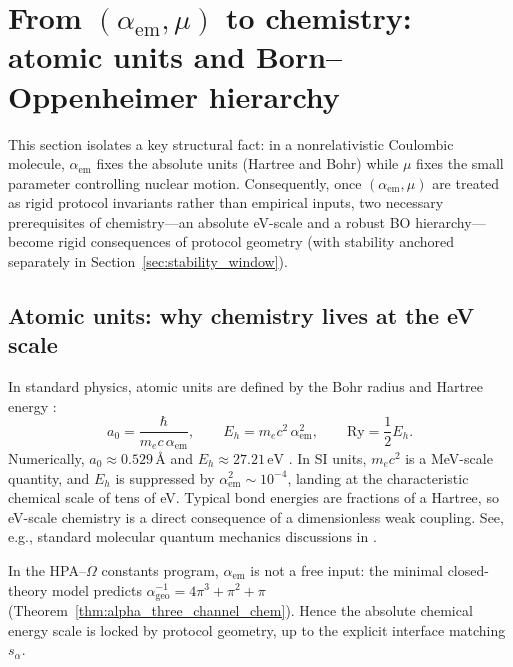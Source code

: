 \section{From $(\alpha_{\mathrm{em}},\mu)$ to chemistry: atomic units and Born--Oppenheimer hierarchy}
\label{sec:chemistry_scaling}

This section isolates a key structural fact: in a nonrelativistic Coulombic molecule, $\alpha_{\mathrm{em}}$ fixes the absolute units (Hartree and Bohr) while $\mu$ fixes the small parameter controlling nuclear motion. Consequently, once $(\alpha_{\mathrm{em}},\mu)$ are treated as rigid protocol invariants rather than empirical inputs, two necessary prerequisites of chemistry---an absolute eV-scale and a robust BO hierarchy---become rigid consequences of protocol geometry (with stability anchored separately in Section~\ref{sec:stability_window}).

\subsection{Atomic units: why chemistry lives at the eV scale}
In standard physics, atomic units are defined by the Bohr radius and Hartree energy \cite{CODATA2022RMP}:
\begin{equation}
a_0=\frac{\hbar}{m_e c\,\alpha_{\mathrm{em}}},
\qquad
E_h=m_e c^2\,\alpha_{\mathrm{em}}^2,
\qquad
\mathrm{Ry}=\frac12 E_h.
\end{equation}
Numerically, $a_0\approx 0.529\,\text{\AA}$ and $E_h\approx 27.21\,\mathrm{eV}$ \cite{CODATA2022RMP}.
In SI units, $m_e c^2$ is a MeV-scale quantity, and $E_h$ is suppressed by $\alpha_{\mathrm{em}}^2\sim 10^{-4}$, landing at the characteristic chemical scale of tens of eV. Typical bond energies are fractions of a Hartree, so eV-scale chemistry is a direct consequence of a dimensionless weak coupling.
See, e.g., standard molecular quantum mechanics discussions in \cite{AtkinsFriedman2011}.

In the HPA--$\Omega$ constants program, $\alpha_{\mathrm{em}}$ is not a free input: the minimal closed-theory model predicts $\alpha_{\mathrm{geo}}^{-1}=4\pi^3+\pi^2+\pi$ (Theorem~\ref{thm:alpha_three_channel_chem}). Hence the absolute chemical energy scale is locked by protocol geometry, up to the explicit interface matching $s_\alpha$.

